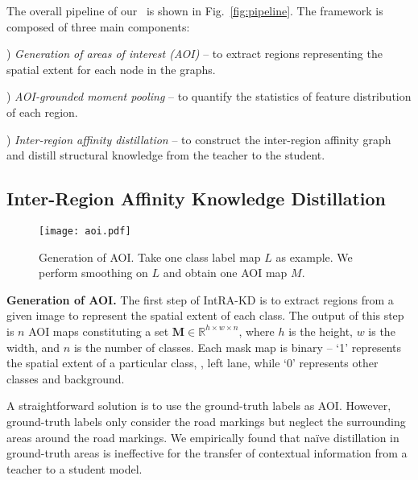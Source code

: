 \documentclass[10pt,twocolumn,letterpaper]{article}
\begin{document}
The overall pipeline of our \algorithmname~is shown in Fig.~\ref{fig:pipeline}.
The framework is composed of three main components: 

) \textit{Generation of areas of interest (AOI)} -- to extract regions representing the spatial extent for each node in the graphs.

) \textit{AOI-grounded moment pooling} -- to quantify the statistics of feature distribution of each region. 

) \textit{Inter-region affinity distillation} -- to construct the inter-region affinity graph and distill structural knowledge from the teacher to the student.







\subsection{Inter-Region Affinity Knowledge Distillation}




\begin{figure}[t]
  \centering
  \texttt{[image: aoi.pdf]}
  \caption{Generation of AOI. Take one class label map $L$ as example. We perform smoothing on $L$ and obtain one AOI map $M$.}
  \centering
  \vskip -0.4cm
  \label{fig:aoi}
\end{figure}

\noindent \textbf{Generation of AOI.} The first step of IntRA-KD is to extract regions from a given image to represent the spatial extent of each class. The output of this step is $n$ AOI maps constituting a set $\mathbf{M} \in \mathbb{R}^{h \times w \times n}$, where $h$ is the height, $w$ is the width, and $n$ is the number of classes.
Each mask map is binary -- `1' represents the spatial extent of a particular class, \eg, left lane, while `0' represents other classes and background.


A straightforward solution is to use the ground-truth labels as AOI. However, ground-truth labels only consider the road markings but neglect the surrounding areas around the road markings. 
We empirically found that na\"{i}ve distillation in ground-truth areas is ineffective for the transfer of contextual information from a teacher to a student model. 
\end{document}
